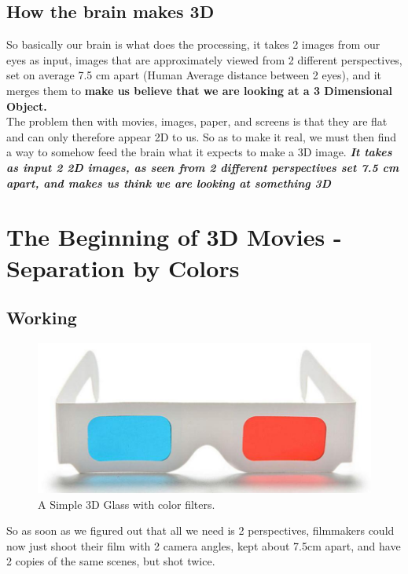 \documentclass[11pt]{article}
\begin{document}
\subsection{How the brain makes 3D}

So basically our brain is what does the processing, it takes 2 images from our eyes as input, images that are approximately viewed from 2 different perspectives, set on average 7.5 cm apart (Human Average distance between 2 eyes), and it merges them to \textbf{make us believe that we are looking at a 3 Dimensional Object.}\\

The problem then with movies, images, paper, and screens is that they are flat and can only therefore appear 2D to us. So as to make it real, we must then find a way to somehow feed the brain what it expects to make a 3D image. \textbf{\textit{\textit{It takes as input 2 2D images, as seen from 2 different perspectives set 7.5 cm apart, and makes us think we are looking at something 3D}}}

\section{The Beginning of 3D Movies - Separation by Colors}

\subsection{Working}

\begin{figure}[H]
	\centering
	\includegraphics[scale=.25]{Color 3D Glass.jpg}
	\caption{A Simple 3D Glass with color filters.}
	\label{fig:This figure}
\end{figure}

So as soon as we figured out that all we need is 2 perspectives, filmmakers could now just shoot their film with 2 camera angles, kept about 7.5cm apart, and have 2 copies of the same scenes, but shot twice.\\ 
\end{document}
